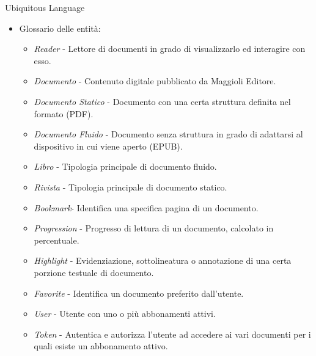     \begin{frame}{Ubiquitous Language}
        \begin{itemize}
            \item Glossario delle entità:
            \begin{itemize}
            \item \textit{Reader} - Lettore di documenti in grado di visualizzarlo ed interagire con esso.
            \item \textit{Documento} - Contenuto digitale pubblicato da Maggioli Editore.
            \item \textit{Documento Statico} - Documento con una certa struttura definita nel formato (PDF).
            \item \textit{Documento Fluido} - Documento senza struttura in grado di adattarsi al dispositivo in cui viene aperto (EPUB).
            \item \textit{Libro} - Tipologia principale di documento fluido.
            \item \textit{Rivista} - Tipologia principale di documento statico.
            \item \textit{Bookmark}- Identifica una specifica pagina di un documento.
            \item \textit{Progression} - Progresso di lettura di un documento, calcolato in percentuale.
            \item \textit{Highlight} - Evidenziazione, sottolineatura o annotazione di una certa porzione testuale di documento.
            \item \textit{Favorite} - Identifica un documento preferito dall'utente.
            \item \textit{User} - Utente con uno o più abbonamenti attivi.
            \item \textit{Token} - Autentica e autorizza l'utente ad accedere ai vari documenti per i quali esiste un abbonamento attivo.
            \end{itemize}
        \end{itemize}
    \end{frame}


